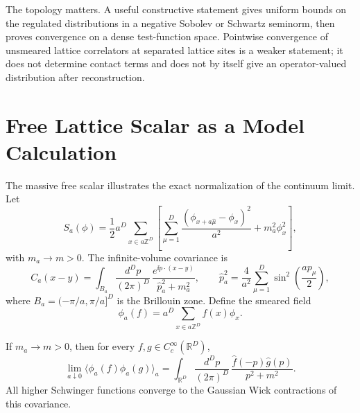 The topology matters.  A useful constructive statement gives uniform bounds
on the regulated distributions in a negative Sobolev or Schwartz seminorm,
then proves convergence on a dense test-function space.  Pointwise
convergence of unsmeared lattice correlators at separated lattice sites is a
weaker statement; it does not determine contact terms and does not by itself
give an operator-valued distribution after reconstruction.

\section{Free Lattice Scalar as a Model Calculation}

The massive free scalar illustrates the exact normalization of the
continuum limit.  Let
\begin{equation}
  S_a(\phi)
  =
  \frac12 a^D\sum_{x\in a\mathbb Z^D}
  \left[
    \sum_{\mu=1}^D
    \frac{(\phi_{x+a\hat\mu}-\phi_x)^2}{a^2}
    +m_a^2\phi_x^2
  \right],
  \label{eq:continuum-limit-free-lattice-action}
\end{equation}
with \(m_a\to m>0\).  The infinite-volume covariance is
\begin{equation}
  C_a(x-y)
  =
  \int_{B_a}\frac{d^Dp}{(2\pi)^D}\,
  \frac{e^{\ii p\cdot(x-y)}}
       {\hat p_a^2+m_a^2},
  \qquad
  \hat p_a^2=\frac{4}{a^2}\sum_{\mu=1}^D
  \sin^2\!\left(\frac{ap_\mu}{2}\right),
  \label{eq:continuum-limit-free-lattice-covariance}
\end{equation}
where \(B_a=(-\pi/a,\pi/a]^D\) is the Brillouin zone.  Define the smeared
field
\[
  \phi_a(f)=a^D\sum_{x\in a\mathbb Z^D} f(x)\phi_x .
\]

\begin{proposition}
\label{prop:free-lattice-scalar-continuum-limit}
If \(m_a\to m>0\), then for every \(f,g\in C_c^\infty(\mathbb R^D)\),
\begin{equation}
  \lim_{a\downarrow0}
  \langle\phi_a(f)\phi_a(g)\rangle_a
  =
  \int_{\mathbb R^D}\frac{d^Dp}{(2\pi)^D}\,
  \frac{\widehat f(-p)\widehat g(p)}{p^2+m^2}.
  \label{eq:continuum-limit-free-scalar-limit}
\end{equation}
All higher Schwinger functions converge to the Gaussian Wick contractions of
this covariance.
\end{proposition}

